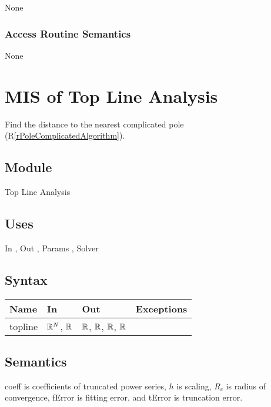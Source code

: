 \documentclass[12pt, titlepage]{article}
\newcommand{\rref}[1]{(R\ref{#1})}
\begin{document}
None

\subsubsection{Access Routine Semantics}

None


\newpage

\section{MIS of Top Line Analysis} \label{sc:MIS_POLETOPLINEMODULE}

Find the distance to the nearest complicated pole \rref{rPoleComplicatedAlgorithm}.

\subsection{Module}

Top Line Analysis

\subsection{Uses}

In , Out , Params , Solver 

\subsection{Syntax}

\begin{tabular}{p{3cm} p{5cm} p{3cm} >{\raggedright\arraybackslash}p{5cm}}
\toprule
\textbf{Name} & \textbf{In} & \textbf{Out} & \textbf{Exceptions} \\
\midrule
  topline & $\mathbb{R}^N$, $\mathbb{R}$ &  $\mathbb{R}$, $\mathbb{R}$, $\mathbb{R}$, $\mathbb{R}$ &  \\
\bottomrule
\end{tabular}

\subsection{Semantics}

coeff is coefficients of truncated power series,
$h$ is scaling,
$R_c$ is radius of convergence,
fError is fitting error, and
tError is truncation error.
\end{document}
